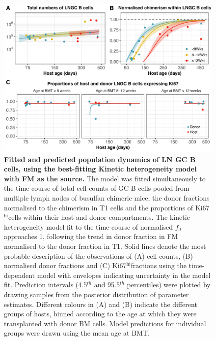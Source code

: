 \documentclass[11pt]{article}
\newcommand{\khi}{Ki67$^\text{hi}$}
\begin{document}
    
    \begin{figure}[h!]
    	\centerline{\includegraphics[scale = 0.85] {Results_LNGC_FM.pdf}}
    		\caption{\small \textbf{Fitted and predicted population dynamics of LN GC B cells, using the best-fitting Kinetic heterogeneity model with FM as the source.}  The model was fitted simultaneously to the  time-course of total cell counts of GC B cells pooled from multiple lymph nodes of busulfan chimeric mice, the donor fractions normalised to the chimerism in T1 cells and the proportions of \khi cells within their host and donor compartments.  The kinetic heterogeneity model fit to the time-course of normalised $f_{d}$  approaches 1, following the trend in donor fraction in FM normalised to the donor fraction in T1. Solid lines denote the most probable description of the observations of (A) cell counts, (B) normalised donor fractions and (C) \khi fractions using the time-dependent model with envelopes indicating uncertainty in the model fit. Prediction intervals (4.5$^{th}$ and 95.5$^{th}$ percentiles) were plotted by drawing samples from the posterior distribution of parameter estimates. Different colours in (A) and (B) indicate the different groups of hosts, binned according to the age at which they were transplanted with donor BM cells. Model predictions for individual groups were drawn using the mean age at BMT.}
    		\label{fig:results_LNGC}
    \end{figure}
	
\end{document}

